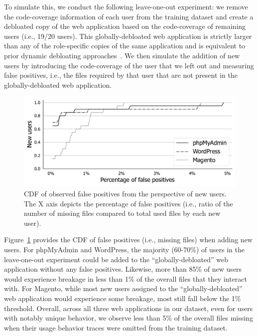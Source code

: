 To simulate this, we conduct the following leave-one-out experiment: we remove the code-coverage information of each user from the training dataset and create a debloated copy of the web application based on the code-coverage of remaining users (i.e., 19/20 users). 
This globally-debloated web application is strictly larger than any of the role-specific copies of the same application and is equivalent to prior dynamic debloating approaches~\cite{lessismore}. We then simulate the addition of new users by introducing the code-coverage of the user that we left out and measuring false positives, i.e., the files required by that user that are not present in the globally-debloated web application.

\begin{figure}[t]
    \centering
    \includegraphics[width=\linewidth]{figures/dbltr/cdf_falsepositives_bw.pdf}
    \caption{CDF of observed false positives from the perspective of new users. The X axis depicts the percentage of false positives (i.e., ratio of the number of missing files compared to total used files by each new user).}
    \label{fig:adding_new_users}
\end{figure}

Figure~\ref{fig:adding_new_users} provides the CDF of false positives (i.e., missing files) when adding new users. 
For phpMyAdmin and WordPress, the majority (60-70\%) of users in the leave-one-out experiment could be added to the ``globally-debloated'' web application without any false positives. 
Likewise, more than 85\% of new users would experience breakage in less than 1\% of the overall files that they interact with. 
For Magento, while most new users assigned to the ``globally-debloated'' web application would experience some breakage, most still fall below the 1\% threshold. 
Overall, across all three web applications in our dataset, even for users with notably unique behavior, we observe less than 5\% of the overall files missing when their usage behavior traces were omitted from the training dataset. 

